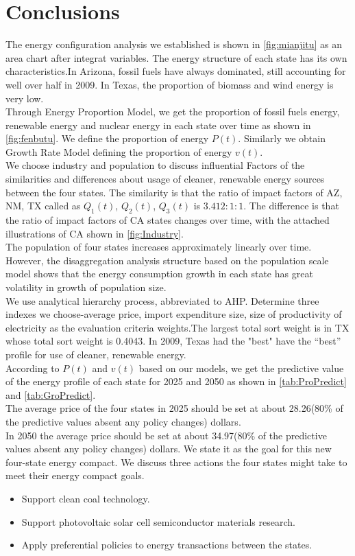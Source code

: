 \section{Conclusions}
The energy configuration analysis we established is shown in \autoref{fig:mianjitu} as an area chart after integrat variables. The energy structure of each state has its own characteristics.In Arizona, fossil fuels have always dominated, still accounting for well over half in 2009. In Texas, the proportion of biomass and wind energy is very low.\\
Through Energy Proportion Model, we get the proportion of fossil fuels
energy, renewable energy and nuclear energy in each state over time as shown in \autoref{fig:fenbutu}.
We define the proportion of energy $ P(t) $. Similarly we obtain Growth Rate Model defining the proportion of energy  $ v(t) $.\\We choose industry and  population to discuss influential Factors of the similarities and differences about usage of cleaner, renewable energy sources between the four states. The similarity is that the ratio of impact factors of AZ, NM, TX called as $ Q_{1}(t) $, $ Q_{2}(t) $, $ Q_{3}(t) $ is $ 3.412:1:1 $.
The difference is that the ratio of impact factors of CA states changes over time, with the attached illustrations of CA shown in \autoref{fig:Industry}.\\
The population of four states increases approximately linearly over time. However, the disaggregation analysis structure based on the population scale model shows that the energy consumption growth in each state has great volatility in growth of population size.\\
We use analytical hierarchy process, abbreviated to AHP. Determine three indexes we choose-average price, import expenditure size, size of productivity of electricity as the evaluation criteria weights.The largest total sort weight is in TX whose total sort weight is 0.4043. In 2009, Texas had the "best" have the “best” profile for use of cleaner, renewable energy.\\
According to $ P(t) $ and  $ v(t) $ based on our models, we get the predictive value of the energy profile of each state for 2025 and 2050 as shown in \autoref{tab:ProPredict} and \autoref{tab:GroPredict}.\\
The average price of the four states in 2025 should be set at about 28.26(80\% of the predictive values absent any policy changes) dollars.\\
In 2050 the average price should be set at about 34.97(80\% of the predictive values absent any policy changes) dollars. We state it as the goal for this new four-state energy compact.
We discuss three actions the four states might take to meet their energy
compact goals.
\begin{itemize}
	\item Support clean coal technology.
    \item Support photovoltaic solar cell semiconductor materials research.
    \item Apply preferential policies to energy transactions between the states.
\end{itemize}

